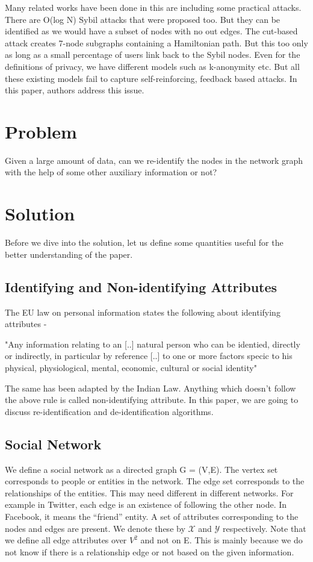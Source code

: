 \documentclass[preprint,12pt]{elsarticle}
\theoremstyle{definition}
\theoremstyle{remark}
\begin{document}
Many related works have been done in this are including some practical attacks. There are O(log N) Sybil attacks that were proposed too. But they can be identified as we would have a subset of nodes with no out edges.  The cut-based attack creates 7-node subgraphs containing a Hamiltonian path. But this too only as long as a small percentage of users link back to the Sybil nodes. Even for the definitions of privacy, we have different models such as k-anonymity etc. But all these existing models fail to capture self-reinforcing, feedback based attacks. In this paper, authors address this issue.

\section{Problem}
Given a large amount of data, can we re-identify the nodes in the network graph with the help of some other auxiliary information or not?

\section{Solution}
Before we dive into the solution, let us define some quantities useful for the better understanding of the paper.

\subsection{Identifying and Non-identifying Attributes}
The EU law on personal information states the following about identifying attributes -

\begin{center}
"Any information relating to an [..] natural person who can be identied, directly or indirectly, in particular by reference [..] to one or more factors specic to his physical, physiological, mental, economic, cultural or social identity"
\end{center}

The same has been adapted by the Indian Law. Anything which doesn't follow the above rule is called non-identifying attribute. In this paper, we are going to discuss re-identification and de-identification algorithms.

\subsection{Social Network}
We define a social network as a directed graph G = (V,E). The vertex set corresponds to people or entities in the network. The edge set corresponds to the relationships of the entities. This may need different in different networks. For example in Twitter, each edge is an existence of following the other node. In Facebook, it means the “friend” entity. A set of attributes corresponding to the nodes and edges are present. We denote these by $\mathcal{X}$ and $\mathcal{Y}$ respectively. Note that we define all edge attributes over $V^2$ and not on E. This is mainly because we do not know if there is a relationship edge or not based on the given information.
\end{document}
